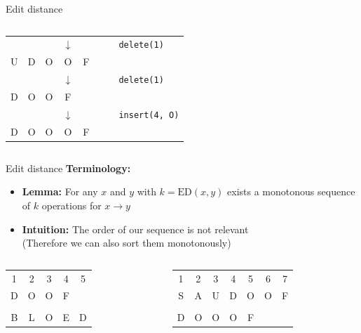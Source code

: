 \begin{frame}{Edit distance}
\begin{columns}
\begin{column}{0.5\linewidth}
\begin{center}
\begin{tabular}{c@{}c@{}c@{}c@{}c@{}c@{}cl}
          {} & {} & {} & $\downarrow$ & {} & {} & {} &
          \texttt{delete({\color{Mittel-Blau}1})}\\
          U & D & O & O & F\\
          {} & {} & {} & $\downarrow$ & {} & {} & {} &
          \texttt{delete({\color{Mittel-Blau}1})}\\
          D & O & O & F\\
          {} & {} & {} & $\downarrow$ & {} & {} & {} &
          \texttt{insert({\color{Mittel-Blau}4}, O)}\\
          D & O & O & O & F
        \end{tabular}
      \end{center}
    \end{column}
  \end{columns}
\end{frame}


\begin{frame}{Edit distance}
  \textbf{Terminology:}
  \begin{itemize}
    \item<2->
      \textbf{Lemma:}
      For any {\color{Mittel-Blau}$x$} and {\color{Mittel-Blau}$y$}
      with $k = \mathrm{ED}(x, y)$ exists a {\color{Mittel-Blau}monotonous}
      sequence of $k$ operations for {\color{Mittel-Blau}$x \rightarrow y$}
    \item<3->
      \textbf{Intuition:}
      The order of our sequence is not relevant\\
      (Therefore we can also sort them monotonously)
  \end{itemize}
  \begin{columns}[T]
    \begin{column}{0.5\linewidth}
      \begin{center}
        \begin{tabular}{ccccc}
          1 & 2 & 3 & 4 & 5\\
          D & O & O & F\\
          \\
          B & L & O & E & D
        \end{tabular}
      \end{center}
    \end{column}
    \begin{column}{0.5\linewidth}
      \begin{center}
        \begin{tabular}{ccccccc}
          1 & 2 & 3 & 4 & 5 & 6 & 7\\
          S & A & U & D & O & O & F\\
          \\
          D & O & O & O & F
        \end{tabular}
      \end{center}
    \end{column}
  \end{columns}
\end{frame}

